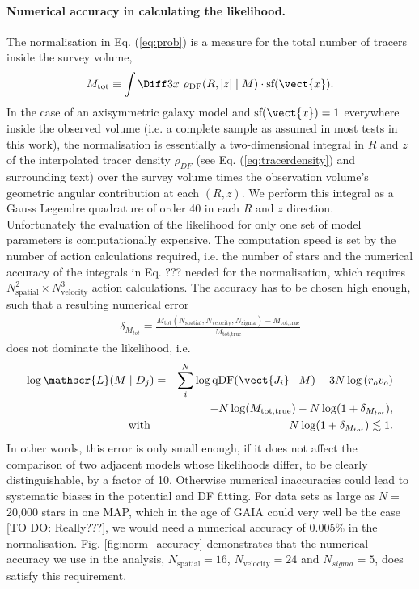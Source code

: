\paragraph{Numerical accuracy in calculating the likelihood.} The normalisation in Eq. (\ref{eq:prob}) is a measure for the total number of tracers inside the survey volume,
\begin{equation}
M_\text{tot} \equiv \int \Diff 3 x \  \rho_\text{DF}(R,|z| \mid M) \cdot \text{sf}(\vect{x}).\label{eq:normalisation}
\end{equation}
In the case of an axisymmetric galaxy model and $\text{sf}(\vect{x})=1$ everywhere inside the observed volume (i.e. a complete sample as assumed in most tests in this work), the normalisation is essentially a two-dimensional integral in $R$ and $z$ of the interpolated tracer density $\rho_{DF}$ (see Eq. (\ref{eq:tracerdensity}) and surrounding text) over the survey volume times the observation volume's geometric angular contribution at each $(R,z)$. We perform this integral as a Gauss Legendre quadrature of order 40 in each $R$ and $z$ direction.
\\Unfortunately the evaluation of the likelihood for only one set of model parameters is computationally expensive. The computation speed is set by the number of action calculations required, i.e. the number of stars and the numerical accuracy of the integrals in Eq. ??? needed for the normalisation, which requires $N_\text{spatial}^2 \times N_\text{velocity}^3$ action calculations. The accuracy has to be chosen high enough, such that a resulting numerical error 
\begin{eqnarray}
\delta_{M_{tot}} \equiv \frac{M_\text{tot}(N_\text{spatial},N_\text{velocity},N_\text{sigma}) -  M_\text{tot,true} }{M_\text{tot,true}}\label{eq:relerrlikelihood}
\end{eqnarray}
does not dominate the likelihood, i.e.
\begin{eqnarray}
\log \mathscr{L}(M \mid D_j) &=& \sum_i^{N} \log \text{qDF}(\vect{J_i} \mid M) - 3N \log \left( r_o v_o\right)\nonumber\\
& & -N \log(M_\text{tot,true}) - N \log (1 + \delta_{M_{tot}}),\label{eq:loglikelihood_relerr}\\
 \text{with }  & &N \log (1 + \delta_{M_{tot}}) \lesssim 1.\nonumber
\end{eqnarray}
In other words, this error is only small enough, if it does not affect the comparison of two adjacent models whose likelihoods differ, to be clearly distinguishable, by a factor of 10. Otherwise numerical inaccuracies could lead to systematic biases in the potential and DF fitting. For data sets as large as $N =$ 20,000 stars in one MAP, which in the age of GAIA could very well be the case [TO DO: Really???], we would need a numerical accuracy of 0.005\% in the normalisation. Fig. \ref{fig:norm_accuracy} demonstrates that the numerical accuracy we use in the analysis, $N_\text{spatial}=16$, $N_\text{velocity}=24$ and $N_{sigma}=5$, does satisfy this requirement.

